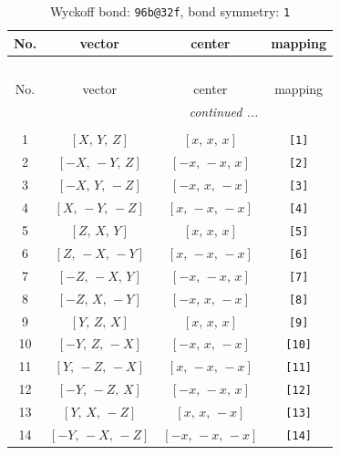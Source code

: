 \documentclass[fleqn,8pt]{jsarticle}
\begin{document}
\begin{longtable}{cccc}
\caption{Wyckoff bond: {\tt 96b@32f}, bond symmetry: {\tt 1}}
 \\
 \hline \hline
No. & vector & center & mapping \\ \hline \endfirsthead

\multicolumn{3}{l}{\tablename\ \thetable{}} \\
 \hline \hline
No. & vector & center & mapping \\ \hline \endhead

 \hline \hline
\multicolumn{3}{r}{\footnotesize\it continued ...} \\ \endfoot

 \hline \hline
\multicolumn{3}{r}{} \\ \endlastfoot

1 & $\left[ X,\, Y,\, Z \right]$ & $\left[ x,\, x,\, x \right]$ & {\tt [1]} \\ \hline
2 & $\left[ - X,\, - Y,\, Z \right]$ & $\left[ - x,\, - x,\, x \right]$ & {\tt [2]} \\ \hline
3 & $\left[ - X,\, Y,\, - Z \right]$ & $\left[ - x,\, x,\, - x \right]$ & {\tt [3]} \\ \hline
4 & $\left[ X,\, - Y,\, - Z \right]$ & $\left[ x,\, - x,\, - x \right]$ & {\tt [4]} \\ \hline
5 & $\left[ Z,\, X,\, Y \right]$ & $\left[ x,\, x,\, x \right]$ & {\tt [5]} \\ \hline
6 & $\left[ Z,\, - X,\, - Y \right]$ & $\left[ x,\, - x,\, - x \right]$ & {\tt [6]} \\ \hline
7 & $\left[ - Z,\, - X,\, Y \right]$ & $\left[ - x,\, - x,\, x \right]$ & {\tt [7]} \\ \hline
8 & $\left[ - Z,\, X,\, - Y \right]$ & $\left[ - x,\, x,\, - x \right]$ & {\tt [8]} \\ \hline
9 & $\left[ Y,\, Z,\, X \right]$ & $\left[ x,\, x,\, x \right]$ & {\tt [9]} \\ \hline
10 & $\left[ - Y,\, Z,\, - X \right]$ & $\left[ - x,\, x,\, - x \right]$ & {\tt [10]} \\ \hline
11 & $\left[ Y,\, - Z,\, - X \right]$ & $\left[ x,\, - x,\, - x \right]$ & {\tt [11]} \\ \hline
12 & $\left[ - Y,\, - Z,\, X \right]$ & $\left[ - x,\, - x,\, x \right]$ & {\tt [12]} \\ \hline
13 & $\left[ Y,\, X,\, - Z \right]$ & $\left[ x,\, x,\, - x \right]$ & {\tt [13]} \\ \hline
14 & $\left[ - Y,\, - X,\, - Z \right]$ & $\left[ - x,\, - x,\, - x \right]$ & {\tt [14]} \\ \hline

\end{longtable}
\end{document}
